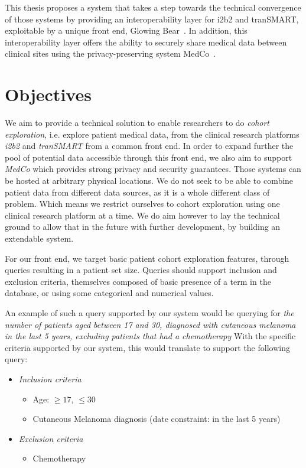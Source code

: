 This thesis proposes a system that takes a step towards the technical convergence of those systems by providing an interoperability layer for i2b2 and tranSMART, exploitable by a unique front end, Glowing Bear~\cite{gb}.
In addition, this interoperability layer offers the ability to securely share medical data between clinical sites using the privacy-preserving system MedCo~\cite{medco}.


\section{Objectives}

We aim to provide a technical solution to enable researchers to do \emph{cohort exploration}, i.e. explore patient medical data, from the clinical research platforms \emph{i2b2} and \emph{tranSMART} from a common front end.
In order to expand further the pool of potential data accessible through this front end, we also aim to support \emph{MedCo} which provides strong privacy and security guarantees.
Those systems can be hosted at arbitrary physical locations.
We do not seek to be able to combine patient data from different data sources, as it is a whole different class of problem.
Which means we restrict ourselves to cohort exploration using one clinical research platform at a time.
We do aim however to lay the technical ground to allow that in the future with further development, by building an extendable system.

For our front end, we target basic patient cohort exploration features, through queries resulting in a patient set size.
Queries should support inclusion and exclusion criteria, themselves composed of basic presence of a term in the database, or using some categorical and numerical values.

An example of such a query supported by our system would be querying for
\emph{the number of patients aged between 17 and 30, diagnosed with cutaneous melanoma in the last 5 years, excluding patients that had a chemotherapy}
With the specific criteria supported by our system, this would translate to support the following query:
\begin{itemize}
    \item \emph{Inclusion criteria}
    \begin{itemize}
        \item Age: $\geq 17$, $\leq 30$
        \item Cutaneous Melanoma diagnosis (date constraint: in the last 5 years)  
    \end{itemize}
    
    \item \emph{Exclusion criteria}
    \begin{itemize}
        \item Chemotherapy
    \end{itemize}
\end{itemize}


